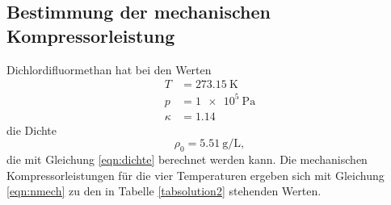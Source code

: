\subsection{Bestimmung der mechanischen Kompressorleistung}
Dichlordifluormethan hat bei den Werten \cite{V206}
\begin{align*}
    T &= \SI{273.15}{\kelvin} \\
    p &= \SI{1e5}{\pascal} \\
    \kappa &= \num{1.14}
\end{align*}
die Dichte 
\begin{equation*}
    \rho_0 = \SI{5.51}{\gram\per\liter},
\end{equation*}
die mit Gleichung \eqref{eqn:dichte} berechnet werden kann.
Die mechanischen Kompressorleistungen für die vier Temperaturen
ergeben sich mit Gleichung \eqref{eqn:nmech}
zu den in Tabelle \ref{tabsolution2} stehenden Werten.
